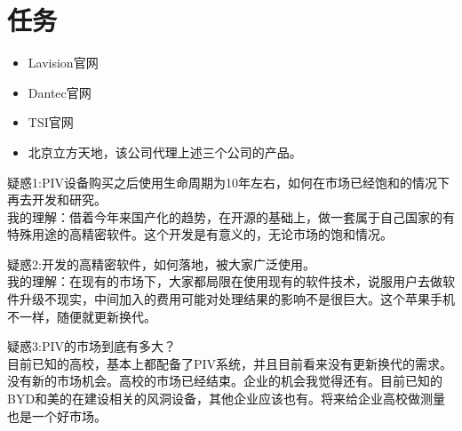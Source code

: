 \documentclass[12pt, a4paper, oneside]{ctexart}
\begin{document}

\section{任务}

\begin{itemize}
    \item Lavision官网
    \item Dantec官网
    \item TSI官网
    \item 北京立方天地，该公司代理上述三个公司的产品。
\end{itemize}

疑惑1:PIV设备购买之后使用生命周期为10年左右，如何在市场已经饱和的情况下再去开发和研究。
\\ 我的理解：借着今年来国产化的趋势，在开源的基础上，做一套属于自己国家的有特殊用途的高精密软件。这个开发是有意义的，无论市场的饱和情况。

疑惑2:开发的高精密软件，如何落地，被大家广泛使用。
\\ 我的理解：在现有的市场下，大家都局限在使用现有的软件技术，说服用户去做软件升级不现实，中间加入的费用可能对处理结果的影响不是很巨大。这个苹果手机不一样，随便就更新换代。

疑惑3:PIV的市场到底有多大？
\\ 目前已知的高校，基本上都配备了PIV系统，并且目前看来没有更新换代的需求。没有新的市场机会。高校的市场已经结束。企业的机会我觉得还有。目前已知的BYD和美的在建设相关的风洞设备，其他企业应该也有。将来给企业高校做测量也是一个好市场。



\end{document}
